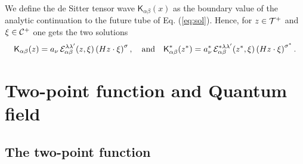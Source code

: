 \documentclass[a4paper,11pt,showpacs,preprintnumbers]{revtex4}
\def\K{\textsf{K}}
\begin{document}
We define the  de Sitter tensor wave ${\K}_{\alpha\beta}(x)$ as
the boundary value of the analytic continuation to the future tube
of Eq. (\ref{eq:sol}). Hence, for $z \in {\cal T}^+ $ and $\xi \in
{\cal C}^+$ one gets the two solutions
\begin{equation}\label{eq:dswave}
{\K}_{\alpha\beta}(z)= a_{\nu}\,{\cal
E}_{\alpha\beta}^{\lambda\lambda'}(z,\xi) \left( Hz\cdot
\xi\right)^{\sigma},\quad\mbox{and}\quad
{\K}_{\alpha\beta}^{*}(z^{*})=a_{\nu}^{*}\,{\cal
E}_{\alpha\beta}^{*\lambda\lambda'}(z^{*},\xi) \left( Hz\cdot
\xi\right)^{\sigma^{*}}.
\end{equation}
\setcounter{equation}{0}
\section{Two-point function and Quantum field }
\subsection{The two-point function}
\end{document}
